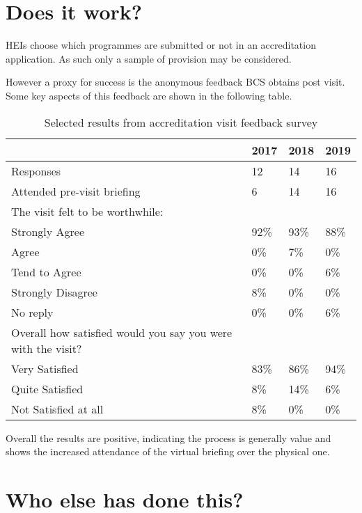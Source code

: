 \documentclass[sigconf]{acmart}
\begin{document}
\section {Does it work?}

HEIs choose which programmes are submitted or not in an accreditation application. As such only a sample of provision may be considered.

However a proxy for success is the anonymous feedback BCS obtains post visit. Some key aspects of this feedback are shown in the following table.

\begin{table}[h!]
  \caption{Selected results from accreditation visit feedback survey}
  \label{table:1}
\begin{tabular}{ | p{5cm}|p{.75cm}|p{.75cm} |p{.75cm} |}
\hline
 & 2017 & 2018 & 2019   \\ \hline
Responses & 12 & 14 & 16   \\
\hline
Attended pre-visit briefing & 6 & 14 & 16   \\
\hline
The visit felt to be worthwhile: & & &  \\
Strongly Agree &92\% & 93\% &88\% \\
Agree &0\% & 7\% &0\% \\
Tend to Agree &0\% & 0\% &6\% \\
Strongly Disagree &8\% & 0\% &0\% \\
No reply &0\% & 0\% &6\% \\
\hline
Overall how satisfied  would you say you were with the visit? & & &  \\
Very Satisfied &83\% & 86\% &94\% \\
Quite Satisfied &8\% & 14\% &6\% \\
Not Satisfied at all &8\% & 0\% &0\% \\
\hline

\end{tabular}%
\end{table}

Overall the results are positive, indicating the process is generally value and shows the increased attendance of the virtual briefing over the physical one.

\section {Who else has done this?}	
\end{document}
